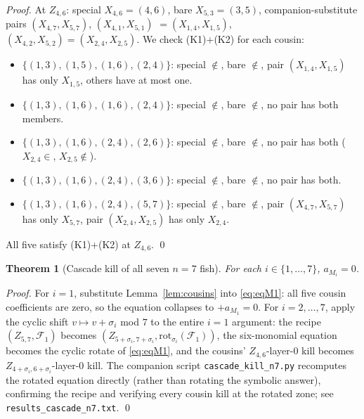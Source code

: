 \documentclass[11pt]{article}
\newtheorem{thm}{Theorem}
\theoremstyle{definition}
\begin{document}
\begin{proof}
At $Z_{4,6}$: special $X_{4,6}=(4,6)$, bare $X_{5,3}=(3,5)$,
companion-substitute pairs $(X_{4,7},X_{5,7})$, $(X_{4,1},X_{5,1})$
$=(X_{1,4},X_{1,5})$, $(X_{4,2},X_{5,2})=(X_{2,4},X_{2,5})$. We check
(K1)+(K2) for each cousin:
\begin{itemize}[leftmargin=*,topsep=1pt,parsep=0pt,itemsep=1pt]
\item $\{(1,3),(1,5),(1,6),(2,4)\}$: special $\notin$, bare $\notin$,
       pair $(X_{1,4},X_{1,5})$ has only $X_{1,5}$, others have at most
       one. \checkmark
\item $\{(1,3),(1,6),(1,6),(2,4)\}$: special $\notin$, bare $\notin$,
       no pair has both members. \checkmark
\item $\{(1,3),(1,6),(2,4),(2,6)\}$: special $\notin$, bare $\notin$,
       no pair has both ($X_{2,4}\in$, $X_{2,5}\notin$).
       \checkmark
\item $\{(1,3),(1,6),(2,4),(3,6)\}$: special $\notin$, bare $\notin$,
       no pair has both. \checkmark
\item $\{(1,3),(1,6),(2,4),(5,7)\}$: special $\notin$, bare $\notin$,
       pair $(X_{4,7},X_{5,7})$ has only $X_{5,7}$, pair
       $(X_{2,4},X_{2,5})$ has only $X_{2,4}$. \checkmark
\end{itemize}
All five satisfy (K1)+(K2) at $Z_{4,6}$. \qed
\end{proof}

\begin{thm}[Cascade kill of all seven $n=7$ fish]\label{thm:main}
For each $i\in\{1,\dots,7\}$, $a_{M_i}=0$.
\end{thm}

\begin{proof}
For $i=1$, substitute Lemma~\ref{lem:cousins} into \eqref{eq:eqM1}:
all five cousin coefficients are zero, so the equation collapses to
$+a_{M_1}=0$. For $i=2,\dots,7$, apply the cyclic shift
$v\mapsto v{+}\sigma_i$ mod $7$ to the entire $i=1$ argument: the recipe
$(Z_{5,7},\mathcal F_1)$ becomes $(Z_{5+\sigma_i,7+\sigma_i},
\mathrm{rot}_{\sigma_i}(\mathcal F_1))$, the six-monomial equation
becomes the cyclic rotate of \eqref{eq:eqM1}, and the cousins'
$Z_{4,6}$-layer-0 kill becomes $Z_{4+\sigma_i,6+\sigma_i}$-layer-0 kill.
The companion script \verb|cascade_kill_n7.py| recomputes the rotated
equation directly (rather than rotating the symbolic answer), confirming
the recipe and verifying every cousin kill at the rotated zone; see
\verb|results_cascade_n7.txt|. \qed
\end{proof}
\end{document}
